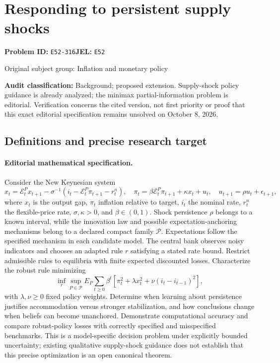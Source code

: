 \documentclass[11pt,a4paper]{article}
\begin{document}
\section*{Responding to persistent supply shocks}
\textbf{Problem ID:} \texttt{E52-316}\quad \textbf{JEL:} \texttt{E52}\par
\label{problem:OP-0248}
{\sffamily\small\color{muted}Original subject group: Inflation and monetary policy\par}
\label{definitions:problem:30007529}
\textbf{Audit classification:} Background; proposed extension. Supply-shock policy guidance is already analyzed; the minimax partial-information problem is editorial. Verification concerns the cited version, not first priority or proof that this exact editorial specification remains unsolved on October 8, 2026.
\subsection*{Definitions and precise research target}
\paragraph{Editorial mathematical specification.} Consider the New Keynesian system
\[
x_t=\mathcal E_t^Px_{t+1}-\sigma^{-1}(i_t-\mathcal E_t^P\pi_{t+1}-r_t^n),\quad
\pi_t=\beta \mathcal E_t^P\pi_{t+1}+\kappa x_t+u_t,\quad
u_{t+1}=\rho u_t+\epsilon_{t+1},
\]
where \(x_t\) is the output gap, \(\pi_t\) inflation relative to target, \(i_t\) the nominal rate, \(r_t^n\) the flexible-price rate, \(\sigma,\kappa>0\), and \(\beta\in(0,1)\). Shock persistence \(\rho\) belongs to a known interval, while the innovation law and possible expectation-anchoring mechanisms belong to a declared compact family \(\mathcal P\). Expectations follow the specified mechanism in each candidate model. The central bank observes noisy indicators and chooses an adapted rule \(r\) satisfying a stated rate bound. Restrict admissible rules to equilibria with finite expected discounted losses.
Characterize the robust rule minimizing
\[
\inf_r\sup_{P\in\mathcal P}E_P\sum_{t\ge0}\beta^t
[\pi_t^2+\lambda x_t^2+\nu(i_t-i_{t-1})^2],
\]
with \(\lambda,\nu\ge0\) fixed policy weights. Determine when learning about persistence justifies accommodation versus stronger stabilization, and how conclusions change when beliefs can become unanchored. Demonstrate computational accuracy and compare robust-policy losses with correctly specified and misspecified benchmarks. This is a model-specific decision problem under explicitly bounded uncertainty; existing qualitative supply-shock guidance does not establish that this precise optimization is an open canonical theorem.
\end{document}
